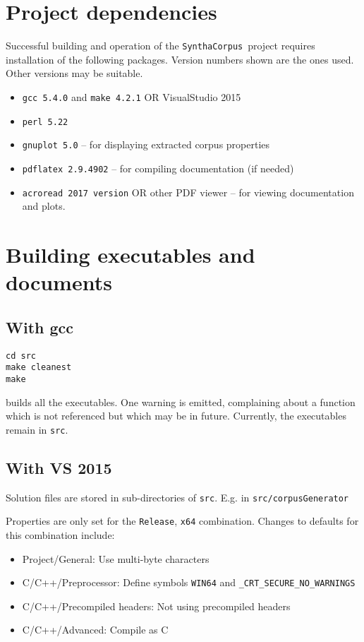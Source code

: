 \documentclass{article}
\newcommand{\projectName}{\texttt{SynthaCorpus}}
\begin{document}
\section{Project dependencies}
Successful building and operation of the \projectName~project requires
installation of the following packages.  Version numbers shown are the
ones used.  Other versions may be suitable.

\begin{itemize}
\item \texttt{gcc 5.4.0} and \texttt{make 4.2.1} OR VisualStudio 2015
\item \texttt{perl 5.22}
  \item \texttt{gnuplot 5.0} -- for displaying extracted corpus properties
  \item \texttt{pdflatex 2.9.4902} -- for compiling documentation (if needed)
    \item \texttt{acroread 2017 version} OR other PDF viewer -- for viewing documentation
      and plots.
\end{itemize}



\section{Building executables and documents}
\subsection{With gcc}

\begin{verbatim}
cd src
make cleanest
make
\end{verbatim}

builds all the executables.  One warning is emitted, complaining about a function which is not
referenced but which may be in future.  Currently, the executables
remain in \texttt{src}.

\subsection{With VS 2015}
Solution files are stored in sub-directories of  \texttt{src}.
E.g. in  \texttt{src/corpusGenerator}

Properties are only set for the \texttt{Release}, \texttt{x64}
combination.  Changes to defaults for this combination include:

\begin{itemize}
\item Project/General:  Use multi-byte characters
  \item C/C++/Preprocessor: Define symbols \texttt{WIN64} and
    \texttt{\_CRT\_SECURE\_NO\_WARNINGS}
  \item C/C++/Precompiled headers: Not using precompiled headers
  \item C/C++/Advanced:  Compile as C
\end{itemize}
\end{document}
